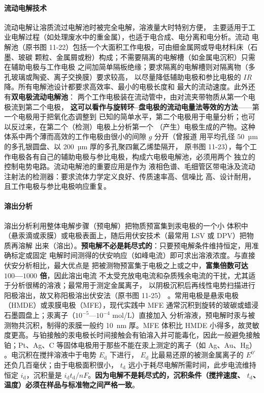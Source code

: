 \paragraph{流动电解技术} 流动电解让溶质流过电解池时被完全电解，溶液量大时特别方便，
主要适用于工业电解过程（如处理废水中的重金属），也适于电合成、电分离和电分析。流动
电解池（原书图 11-22）包括一个大面积工作电极，可由细金属网或导电材料床（石墨、玻碳
颗粒、金属屑或粉）构成；不需要隔离的电解槽（如金属电沉积）只需在辅助电极与工作电极
之间加简单隔板绝缘；要求隔离的电解槽则对隔离物（多孔玻璃或陶瓷、离子交换膜）要求较高，
以尽量降低辅助电极和参比电极的 $IR$ 降。所有电解池设计都要求高效率、最小的电极长度和
最大的流动速度。此外还有\textbf{双电极流动电解池}：
两个工作电极装在流动管中，由对流夹带物质从第一个电极流到第二个电极，
\textbf{这可以看作与旋转环–盘电极的流动电量法等效的方法}——第一个电极用于把氧化态调整到
已知的简单水平，第二个电极用于电量分析；也可以反过来，在第二个（检测）电极上分析第一个
（产生）电极生成的产物。这种体系中两个薄而高效的工作电极由很小的间隙 $g$ 分开（曾报道
用平均孔径 \qty{50}{µm} 的多孔银圆盘、以 \qty{200}{µm} 厚的多孔聚四氟乙烯垫隔开，
原书图 11-23），每个工作电极各有自己的辅助电极与参比电极，构成六电极电解池，必须用两个
独立的控制电势电路。流动电解池的重要应用是作为
液相色谱、毛细管区带电泳及流动注射法的检测器：要求流体力学定义良好、传质速率高、信噪比
高、设计耐用，且工作电极与参比电极响应重复。

\paragraph{溶出分析} 溶出分析利用整体电解步骤（预电解）把物质预富集到汞电极的一个小
体积中（悬汞滴或汞膜）或电极表面上，随后用伏安技术（最常用 LSV 或 DPV）把物质再溶解
出来（溶出）。\textbf{预电解不必是耗尽式的}：只要预电解条件维持恒定，用准确标定或固定
电解时间测得的伏安响应（如峰电流）即可求出溶液浓度。与直接伏安分析相比，最大优点是
把被测物预富集于电极之上或之中，\textbf{富集倍数可达 $100$—$1000$ 倍}，因此溶出电流
不太受充放电电流和杂质残余电流的干扰，尤其适于分析很稀的溶液；最常用于测定金属离子，
以阴极沉积后再线性电势扫描进行阳极溶出，故又称阳极溶出伏安法（原书图 11-25）
。常用电极是悬汞电极（HMDE）或汞膜电极（MFE），现代实践中
MFE 通常沉积到旋转的玻碳或蜡浸石墨圆盘上；汞离子（$10^{-5}$—$10^{-4}$ mol/L）直接加入
分析溶液，预电解时汞与被测物共沉积，制得的汞膜一般约 \qty{10}{nm} 厚。MFE 体积比 HMDE
小得多，故灵敏度更高。与铂接触的汞电极长时间接触会有铂溶入并可能毒化，因此一般避免接触
铂；Pt、Ag、C 等固体电极用于那些不能在汞上测定的离子（如 Ag、Au、Hg）
。电沉积在搅拌溶液中于电势 $E_{\mathrm{d}}$ 下进行，
$E_{\mathrm{d}}$ 比最易还原的被测金属离子的 $E^{0'}$ 还负几百毫伏；由于电极面积很小，
$t_{\mathrm{d}}$ 远小于耗尽电解所需时间，此步电流维持恒定 $i_{\mathrm{d}}$，沉积量是
$i_{\mathrm{d}}t_{\mathrm{d}}/nF$。\textbf{因为电解不是耗尽式的，沉积条件（搅拌速度、
$t_{\mathrm{d}}$、温度）必须在样品与标准物之间严格一致}。


